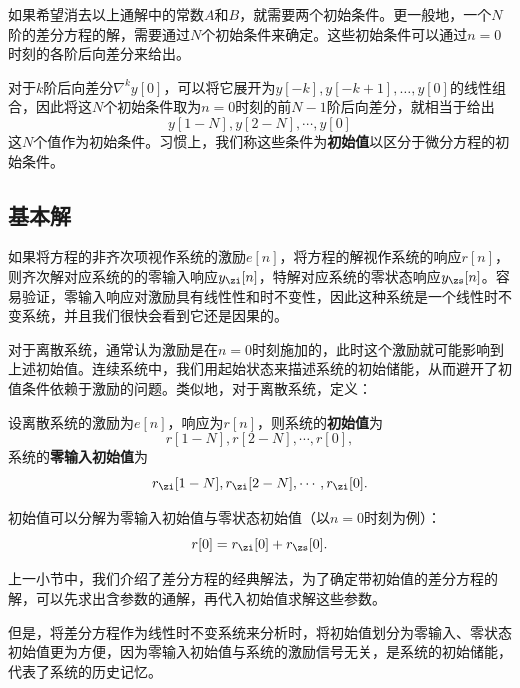 如果希望消去以上通解中的常数$A$和$B$，就需要两个初始条件。更一般地，一个$N$阶的差分方程的解，需要通过$N$个初始条件来确定。这些初始条件可以通过$n=0$时刻的各阶后向差分来给出。

对于$k$阶后向差分$\nabla^k y[0]$，可以将它展开为$y[-k],y[-k+1],\dots,y[0]$的线性组合，因此将这$N$个初始条件取为$n=0$时刻的前$N-1$阶后向差分，就相当于给出
\begin{equation}
    y[1-N],y[2-N],\cdots,y[0]
\end{equation}
这$N$个值作为初始条件。习惯上，我们称这些条件为\textbf{初始值}以区分于微分方程的初始条件。

\subsection{基本解}\label{sub:h_solution}

如果将方程的非齐次项视作系统的激励$e[n]$，将方程的解视作系统的响应$r[n]$，则齐次解对应系统的的零输入响应$y_{\zi}[n]$，特解对应系统的零状态响应$y_{\zs}[n]$。容易验证，零输入响应对激励具有线性性和时不变性，因此这种系统是一个线性时不变系统，并且我们很快会看到它还是因果的。

对于离散系统，通常认为激励是在$n=0$时刻施加的，此时这个激励就可能影响到上述初始值。连续系统中，我们用起始状态来描述系统的初始储能，从而避开了初值条件依赖于激励的问题。类似地，对于离散系统，定义：
\begin{definition}[离散系统的初始值与零输入初始值]
    设离散系统的激励为$e[n]$，响应为$r[n]$，则系统的\textbf{初始值}为
    \begin{equation}
        r[1-N],r[2-N],\cdots,r[0],
    \end{equation}
    系统的\textbf{零输入初始值}为
    \begin{equation}
        r_{\zi}[1-N],r_{\zi}[2-N],\cdots,r_{\zi}[0].
    \end{equation}
\end{definition}

初始值可以分解为零输入初始值与零状态初始值（以$n=0$时刻为例）：
\begin{equation}
    r[0]=r_{\zi}[0]+r_{\zs}[0].
\end{equation}

上一小节中，我们介绍了差分方程的经典解法，为了确定带初始值的差分方程的解，可以先求出含参数的通解，再代入初始值求解这些参数。

但是，将差分方程作为线性时不变系统来分析时，将初始值划分为零输入、零状态初始值更为方便，因为零输入初始值与系统的激励信号无关，是系统的初始储能，代表了系统的历史记忆。

